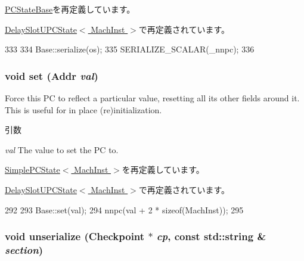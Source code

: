 \hyperlink{classGenericISA_1_1PCStateBase_a53e036786d17361be4c7320d39c99b84}{PCStateBase}を再定義しています。

\hyperlink{classGenericISA_1_1DelaySlotUPCState_a53e036786d17361be4c7320d39c99b84}{DelaySlotUPCState$<$ MachInst $>$}で再定義されています。


\begin{DoxyCode}
333     {
334         Base::serialize(os);
335         SERIALIZE_SCALAR(_nnpc);
336     }
\end{DoxyCode}
\hypertarget{classGenericISA_1_1DelaySlotPCState_a9a5b900e841dd75dc81970850547918f}{
\subsubsection[{set}]{\setlength{\rightskip}{0pt plus 5cm}void set ({\bf Addr} {\em val})}}
\label{classGenericISA_1_1DelaySlotPCState_a9a5b900e841dd75dc81970850547918f}
Force this PC to reflect a particular value, resetting all its other fields around it. This is useful for in place (re)initialization.


\begin{DoxyParams}{引数}
\item[{\em val}]The value to set the PC to. \end{DoxyParams}


\hyperlink{classGenericISA_1_1SimplePCState_a9a5b900e841dd75dc81970850547918f}{SimplePCState$<$ MachInst $>$}を再定義しています。

\hyperlink{classGenericISA_1_1DelaySlotUPCState_a9a5b900e841dd75dc81970850547918f}{DelaySlotUPCState$<$ MachInst $>$}で再定義されています。


\begin{DoxyCode}
292     {
293         Base::set(val);
294         nnpc(val + 2 * sizeof(MachInst));
295     }
\end{DoxyCode}
\hypertarget{classGenericISA_1_1DelaySlotPCState_af22e5d6d660b97db37003ac61ac4ee49}{
\subsubsection[{unserialize}]{\setlength{\rightskip}{0pt plus 5cm}void unserialize ({\bf Checkpoint} $\ast$ {\em cp}, \/  const std::string \& {\em section})}}
\label{classGenericISA_1_1DelaySlotPCState_af22e5d6d660b97db37003ac61ac4ee49}


